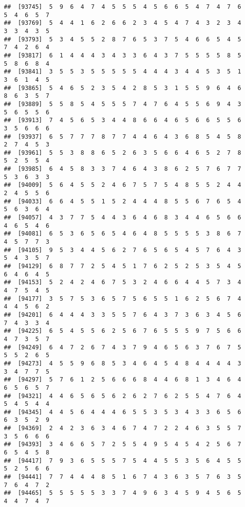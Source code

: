 \documentclass[
]{book}
\begin{document}
\begin{verbatim}
##  [93745]  5  9  6  4  7  4  5  5  5  4  5  6  6  5  4  7  4  7  6  5  4  6  5  7
##  [93769]  5  4  4  1  6  2  6  6  2  3  4  5  4  7  4  3  2  3  4  3  3  4  3  5
##  [93793]  5  3  4  5  5  2  8  7  6  5  3  7  5  4  6  6  5  4  5  7  4  2  6  4
##  [93817]  6  1  4  4  4  3  4  3  3  6  4  3  7  5  5  5  5  8  5  5  8  6  8  4
##  [93841]  3  5  5  3  5  5  5  5  5  4  4  4  3  4  4  5  3  5  1  3  6  1  4  5
##  [93865]  5  4  6  5  2  3  5  4  2  8  5  3  1  5  5  9  6  4  6  8  6  3  5  7
##  [93889]  5  5  8  5  4  5  5  5  7  4  7  6  4  5  5  6  9  4  3  5  6  5  5  6
##  [93913]  7  4  5  6  5  3  4  4  8  6  6  4  6  5  6  6  5  5  6  3  5  6  6  6
##  [93937]  6  5  7  7  7  8  7  7  4  4  6  4  3  6  8  5  4  5  8  2  7  4  5  3
##  [93961]  5  5  3  8  8  6  5  2  6  3  5  6  6  4  6  5  2  7  8  5  2  5  5  4
##  [93985]  6  4  5  8  3  3  7  4  6  4  3  8  6  2  5  7  6  7  7  5  3  6  3  3
##  [94009]  5  6  4  5  5  2  4  6  7  5  7  5  4  8  5  5  2  4  4  2  4  5  5  6
##  [94033]  6  6  4  5  5  1  5  2  4  4  4  8  5  5  6  7  6  5  4  5  6  3  6  4
##  [94057]  4  3  7  7  5  4  4  3  6  4  6  8  3  4  4  6  5  6  6  4  6  5  4  6
##  [94081]  6  5  3  6  5  6  5  4  6  4  8  5  5  5  5  3  8  6  7  4  5  7  7  3
##  [94105]  9  5  3  4  4  5  6  2  7  6  5  6  5  4  5  7  6  4  3  5  4  3  5  7
##  [94129]  6  8  7  7  2  5  4  5  1  7  6  2  5  2  5  3  5  4  5  6  4  6  4  5
##  [94153]  5  2  4  2  4  6  7  5  3  2  4  6  6  4  4  5  7  3  4  4  7  5  4  5
##  [94177]  3  5  7  5  3  6  5  7  5  6  5  5  1  6  2  5  6  7  4  4  4  5  6  2
##  [94201]  6  4  4  4  3  3  5  5  7  6  4  3  7  3  6  3  4  5  6  7  4  3  3  4
##  [94225]  6  5  4  5  5  6  2  5  6  7  6  5  5  5  9  7  5  6  6  4  7  3  5  7
##  [94249]  6  4  7  2  6  7  4  3  7  9  4  6  5  6  3  7  6  7  5  5  5  2  6  5
##  [94273]  4  5  5  9  6  8  5  3  4  6  4  5  4  8  4  4  4  4  3  3  4  7  7  5
##  [94297]  5  7  6  1  2  5  6  6  6  8  4  4  6  8  1  3  4  6  4  6  5  6  5  7
##  [94321]  4  4  6  5  6  5  6  2  6  2  7  6  2  5  5  4  7  6  4  5  4  5  4  4
##  [94345]  4  4  5  6  4  4  4  6  5  5  3  5  3  4  3  3  6  5  6  6  3  5  2  9
##  [94369]  2  4  2  3  6  3  4  6  7  4  7  2  2  4  6  3  5  5  7  3  5  6  6  6
##  [94393]  3  4  6  6  5  7  2  5  5  4  9  5  4  5  4  2  5  6  7  6  5  4  5  8
##  [94417]  7  9  3  6  5  5  5  7  5  4  4  5  5  3  5  6  4  5  5  5  2  5  6  6
##  [94441]  7  7  4  4  4  8  5  1  6  7  4  3  6  3  5  7  6  3  5  7  6  4  7  2
##  [94465]  5  5  5  5  5  3  3  7  4  9  6  3  4  5  9  4  5  6  5  4  4  7  4  7

\end{verbatim}
\end{document}
